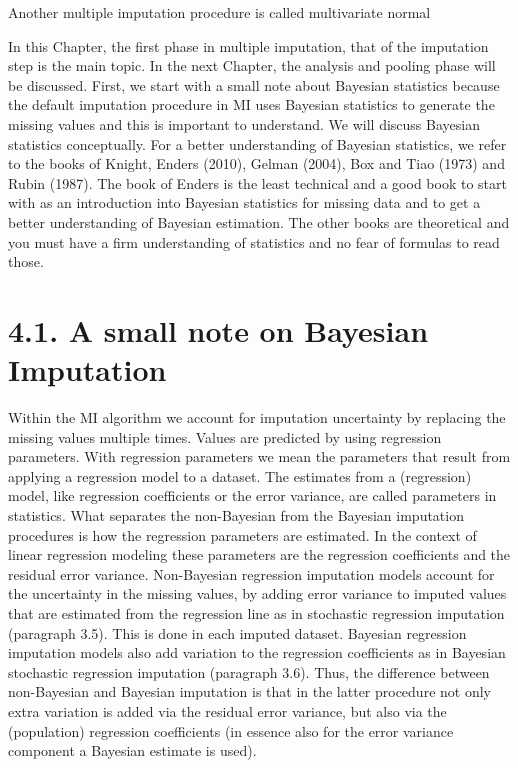 \documentclass[]{book}
\begin{document}
Another multiple imputation procedure is called multivariate normal

In this Chapter, the first phase in multiple imputation, that of the
imputation step is the main topic. In the next Chapter, the analysis and
pooling phase will be discussed. First, we start with a small note about
Bayesian statistics because the default imputation procedure in MI uses
Bayesian statistics to generate the missing values and this is important
to understand. We will discuss Bayesian statistics conceptually. For a
better understanding of Bayesian statistics, we refer to the books of
Knight, Enders (2010), Gelman (2004), Box and Tiao (1973) and Rubin
(1987). The book of Enders is the least technical and a good book to
start with as an introduction into Bayesian statistics for missing data
and to get a better understanding of Bayesian estimation. The other
books are theoretical and you must have a firm understanding of
statistics and no fear of formulas to read those.

\section{4.1. A small note on Bayesian
Imputation}\label{a-small-note-on-bayesian-imputation}

Within the MI algorithm we account for imputation uncertainty by
replacing the missing values multiple times. Values are predicted by
using regression parameters. With regression parameters we mean the
parameters that result from applying a regression model to a dataset.
The estimates from a (regression) model, like regression coefficients or
the error variance, are called parameters in statistics. What separates
the non-Bayesian from the Bayesian imputation procedures is how the
regression parameters are estimated. In the context of linear regression
modeling these parameters are the regression coefficients and the
residual error variance. Non-Bayesian regression imputation models
account for the uncertainty in the missing values, by adding error
variance to imputed values that are estimated from the regression line
as in stochastic regression imputation (paragraph 3.5). This is done in
each imputed dataset. Bayesian regression imputation models also add
variation to the regression coefficients as in Bayesian stochastic
regression imputation (paragraph 3.6). Thus, the difference between
non-Bayesian and Bayesian imputation is that in the latter procedure not
only extra variation is added via the residual error variance, but also
via the (population) regression coefficients (in essence also for the
error variance component a Bayesian estimate is used).
\end{document}
